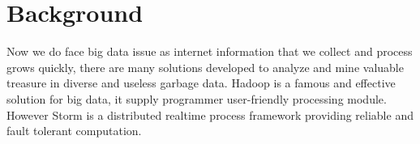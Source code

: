 \chapter{Background}
\label{chap:background}

Now we do face big data issue as internet information that we collect and process grows quickly, there are many solutions developed
 to analyze and mine valuable treasure in diverse and useless garbage data. Hadoop is a famous and effective solution for big data, 
it supply programmer user-friendly processing module. However Storm \cite{Aniello:2013:AOS:2488222.2488267} is a distributed realtime process framework providing reliable 
and fault tolerant computation. 
